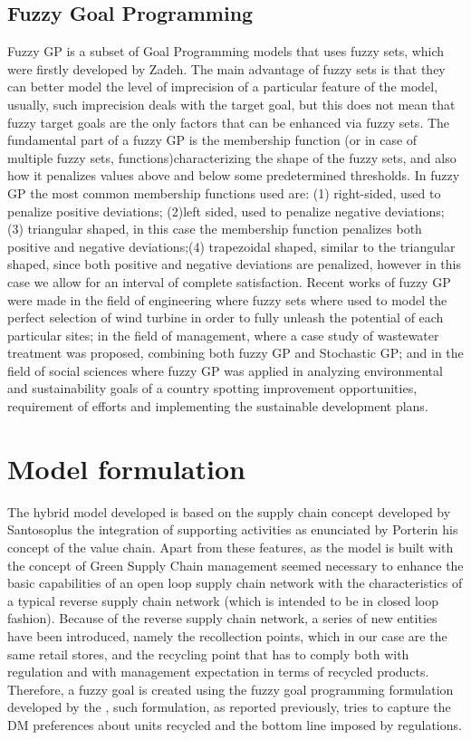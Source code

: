 \begin{doublespace}
  \subsection{Fuzzy Goal Programming}
  Fuzzy GP is a subset of Goal Programming models that uses fuzzy sets, which were firstly developed by Zadeh\cite{Zadeh1965}. The main advantage of fuzzy sets is that they can better model the level of imprecision of a particular feature of the model, usually, such imprecision deals with the target goal, but this does not mean that fuzzy target goals are the only factors that can be enhanced via fuzzy sets. The fundamental part of a fuzzy GP is the membership function (or in case of multiple fuzzy sets, functions)characterizing the shape of the fuzzy sets, and also how it penalizes values above and below some predetermined thresholds. In fuzzy GP the most common membership functions used are: (1) right-sided, used to penalize positive deviations; (2)left sided, used to penalize negative deviations; (3) triangular shaped, in this case the membership function penalizes both positive and negative deviations;(4) trapezoidal shaped, similar to the triangular shaped, since both positive and negative deviations are penalized, however in this case we allow for an interval of complete satisfaction.
  Recent works of fuzzy GP were made in the field of engineering where fuzzy sets where used to model the perfect selection of wind turbine in order to fully unleash the potential of each particular sites\cite{Rehman2017}; in the field of management, where a case study of wastewater treatment was proposed, combining both fuzzy GP and Stochastic GP\cite{Diaz-Madronero2018}; and in the field of social sciences where fuzzy GP was applied in analyzing environmental and sustainability goals of a country spotting improvement opportunities, requirement of efforts and implementing the sustainable development plans\cite{Nomani2016}.   
  \pagebreak

\section{Model formulation}
The hybrid model developed is based on the supply chain concept developed by Santoso\cite{Santoso2005}plus the integration of supporting activities as enunciated by Porter\cite{Porter1998}in his concept of the value chain. Apart from these features, as the model is built with the concept of Green Supply Chain management seemed necessary to enhance the basic capabilities of an open loop supply chain network with the characteristics of a typical reverse supply chain network (which is intended to be in closed loop fashion). Because of the reverse supply chain network, a series of new entities have been introduced, namely the recollection points, which in our case are the same retail stores, and the recycling point that has to comply both with regulation and with management expectation in terms of recycled products. Therefore, a fuzzy goal is created using the fuzzy goal programming formulation developed by the \cite{Yaghobi2008}, such formulation, as reported previously, tries to capture the DM preferences about units recycled and the bottom line imposed by regulations.


\end{doublespace}

